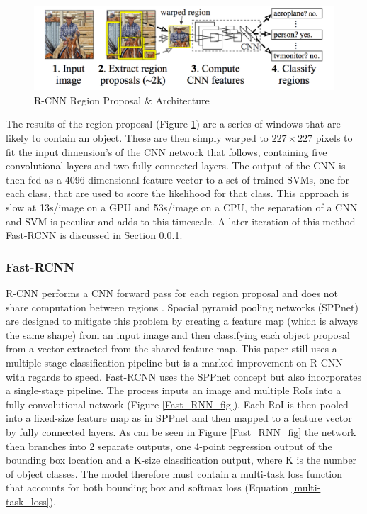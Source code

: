 \documentclass[11pt,twoside]{report}
\begin{document}
\noindent \begin{figure}[h!]
	\includegraphics[width = 1.0\hsize]{./figures/region_prop.png}
	\caption{R-CNN Region Proposal \& Architecture \cite{DBLP:journals/corr/GirshickDDM13}}
	\label{Selective_search}
\end{figure}

The results of the region proposal (Figure \ref{Selective_search}) are a series of windows that are likely to contain an object. These are then simply warped to $227 \times 227$ pixels to fit the input dimension's of the CNN network that follows, containing five convolutional layers and two fully connected layers. The output of the CNN is then fed as a 4096 dimensional feature vector to a set of trained SVMs, one for each class, that are used to score the likelihood for that class. This approach is slow at 13s/image on a GPU and 53s/image on a CPU, the separation of a CNN and SVM is peculiar and adds to this timescale. A later iteration of this method Fast-RCNN is discussed in Section \ref{Fast_RCNN}.

\subsubsection{Fast-RCNN} \label{Fast_RCNN}

R-CNN performs a CNN forward pass for each region proposal and does not share computation between regions \cite{DBLP:journals/corr/Girshick15}. Spacial pyramid pooling networks (SPPnet) \cite{DBLP:journals/corr/HeZR014} are designed to mitigate this problem by creating a feature map (which is always the same shape) from an input image and then classifying each object proposal from a vector extracted from the shared feature map. This paper still uses a multiple-stage classification pipeline but is a marked improvement on R-CNN with regards to speed. 
\newline \newline
Fast-RCNN uses the SPPnet concept but also incorporates a single-stage pipeline. The process inputs an image and multiple RoIs into a fully convolutional network (Figure \ref{Fast_RNN_fig}). Each RoI is then pooled into a fixed-size feature map as in SPPnet and then mapped to a feature vector by fully connected layers. As can be seen in Figure \ref{Fast_RNN_fig} the network then branches into 2 separate outputs, one 4-point regression output of the bounding box location and a K-size classification output, where K is the number of object classes. The model therefore must contain a multi-task loss function that accounts for both bounding box and softmax loss (Equation \ref{multi-task_loss}).
\end{document}
